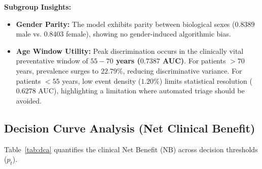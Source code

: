 \documentclass[conference]{IEEEtran}
\begin{document}
\begin{table}[t]
\centering
\caption{Stage 5: Subgroup Fairness and Demographic Audit}
\label{tab:subgroups}
\end{table}

\textbf{Subgroup Insights:}
\begin{itemize}
    \item \textbf{Gender Parity:} The model exhibits parity between biological sexes ($0.8389$ male vs. $0.8403$ female), showing no gender-induced algorithmic bias.
    \item \textbf{Age Window Utility:} Peak discrimination occurs in the clinically vital preventative window of \textbf{$55 - 70$ years ($0.7387$ AUC)}. For patients $>70$ years, prevalence surges to $22.79\%$, reducing discriminative variance. For patients $<55$ years, low event density ($1.20\%$) limits statistical resolution ($0.6278$ AUC), highlighting a limitation where automated triage should be avoided.
\end{itemize}

\subsection{Decision Curve Analysis (Net Clinical Benefit)}
Table~\ref{tab:dca} quantifies the clinical Net Benefit ($\text{NB}$) across decision thresholds ($p_t$).
\end{document}
